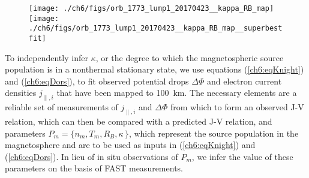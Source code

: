 
  \begin{figure}
    \centering
    \noindent\texttt{[image: ./ch6/figs/orb\_1773\_lump1\_20170423\_\_kappa\_RB\_map]}
    \noindent\texttt{[image: ./ch6/figs/orb\_1773\_lump1\_20170423\_\_kappa\_RB\_map\_\_superbestfit]}
    \caption{}
    \label{ch6:Fig3}
  \end{figure}


  To independently infer $\kappa$, or the degree to which the
  magnetospheric source population is in a nonthermal stationary
  state, we use equations (\ref{ch6:eqKnight}) and (\ref{ch6:eqDors}), to fit
  observed potential drops $\Delta \Phi$ and electron current
  densities $j_{\parallel,i}$ that have been mapped to 100~km. The
  necessary elements are a reliable set of measurements of
  $j_{\parallel,i}$ and $\Delta \Phi$ from which to form an observed
  J-V relation, which can then be compared with a predicted J-V
  relation, and parameters $P_m = \{ n_m, T_m, R_B, \kappa \, \}$,
  which represent the source population in the magnetosphere and are
  to be used as inputs in (\ref{ch6:eqKnight}) and (\ref{ch6:eqDors}). In lieu
  of in situ observations of $P_m$, we infer the value of these
  parameters on the basis of FAST measurements.





